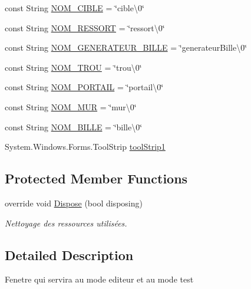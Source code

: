 \begin{DoxyCompactItemize}
const String \hyperlink{class_interface_graphique_1_1_mode_editeur_a5890d47c3c572e33bb8216aeebb851be}{N\-O\-M\-\_\-\-C\-I\-B\-L\-E} = \char`\"{}cible\textbackslash{}0\char`\"{}
\item 
const String \hyperlink{class_interface_graphique_1_1_mode_editeur_af7d4f3681200e7a2b054fe92f6200b3d}{N\-O\-M\-\_\-\-R\-E\-S\-S\-O\-R\-T} = \char`\"{}ressort\textbackslash{}0\char`\"{}
\item 
const String \hyperlink{class_interface_graphique_1_1_mode_editeur_a2b70e220fa60245157bbece9d551e5a8}{N\-O\-M\-\_\-\-G\-E\-N\-E\-R\-A\-T\-E\-U\-R\-\_\-\-B\-I\-L\-L\-E} = \char`\"{}generateur\-Bille\textbackslash{}0\char`\"{}
\item 
const String \hyperlink{class_interface_graphique_1_1_mode_editeur_a0c9ec65075e4af1fc85da53da4972e94}{N\-O\-M\-\_\-\-T\-R\-O\-U} = \char`\"{}trou\textbackslash{}0\char`\"{}
\item 
const String \hyperlink{class_interface_graphique_1_1_mode_editeur_aadd5c7a6609f936011a320dd07b41614}{N\-O\-M\-\_\-\-P\-O\-R\-T\-A\-I\-L} = \char`\"{}portail\textbackslash{}0\char`\"{}
\item 
const String \hyperlink{class_interface_graphique_1_1_mode_editeur_a134c8cc1e90c417cdf1ae062555fde11}{N\-O\-M\-\_\-\-M\-U\-R} = \char`\"{}mur\textbackslash{}0\char`\"{}
\item 
const String \hyperlink{class_interface_graphique_1_1_mode_editeur_ab11f664023d682dfb03a935b52f1d57e}{N\-O\-M\-\_\-\-B\-I\-L\-L\-E} = \char`\"{}bille\textbackslash{}0\char`\"{}
\item 
System.\-Windows.\-Forms.\-Tool\-Strip \hyperlink{class_interface_graphique_1_1_mode_editeur_af52c36ecd90fccddb88d4c1d1c596761}{tool\-Strip1}
\end{DoxyCompactItemize}
\subsection*{Protected Member Functions}
\begin{DoxyCompactItemize}
\item 
override void \hyperlink{class_interface_graphique_1_1_mode_editeur_a9725a75c800fcd38f3fa6291f4d46621}{Dispose} (bool disposing)
\begin{DoxyCompactList}\small\item\em Nettoyage des ressources utilisées. \end{DoxyCompactList}\end{DoxyCompactItemize}


\subsection{Detailed Description}
Fenetre qui servira au mode editeur et au mode test 



